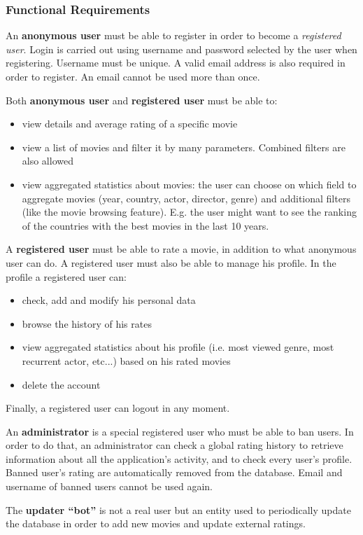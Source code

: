 \documentclass[11pt]{article}
\begin{document}
\subsubsection{Functional Requirements}
An \textbf{anonymous user} must be able to register in order to become a 
\textit{registered user}. Login is carried out using username and password selected 
by the user when registering. Username must be unique. A valid email address is
also required in order to register. An email cannot be used more than once.

Both \textbf{anonymous user} and \textbf{registered user} must be able to:
\begin{itemize}
	\item view details and average rating of a specific movie
	\item view a list of movies and filter it by many parameters. Combined filters 
	are also allowed
	\item view aggregated statistics about movies: the user can choose on which field to aggregate movies (year, country, actor, director, genre) and additional filters (like the movie browsing feature). E.g. the user might want to see the ranking of the countries with the best movies in the last 10 years.
\end{itemize}

A \textbf{registered user} must be able to rate a movie, in addition to what anonymous
user can do. A registered user must also be able to manage his profile. In the profile a
registered user can:
\begin{itemize}
	\item check, add and modify his personal data
	\item browse the history of his rates
	\item view aggregated statistics about his profile (i.e. most viewed genre,
	most recurrent actor, etc...) based on his rated movies
	\item delete the account
\end{itemize}
Finally, a registered user can logout in any moment.

An \textbf{administrator} is a special registered user who must be able to ban users.
In order to do that, an administrator can check a global rating history to retrieve information
about all the application's activity, and to check every user's profile.
Banned user's rating are automatically removed from the database. Email and username
of banned users cannot be used again.

The \textbf{updater ``bot''} is not a real user but an entity used to periodically update the database in order to add new movies and update external ratings. 
\end{document}
